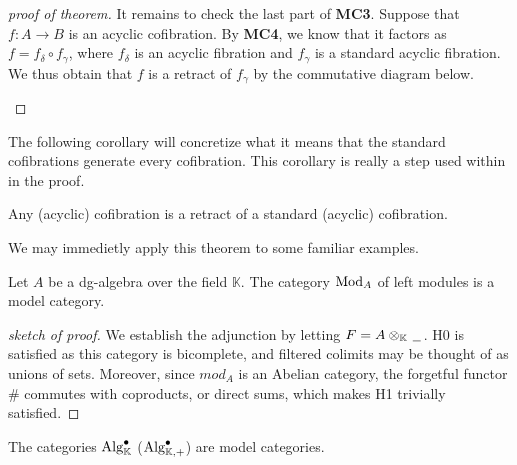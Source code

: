 \documentclass[../thesis.tex]{subfiles}
\begin{document}
\begin{proof}[proof of theorem]
                It remains to check the last part of \textbf{MC3}. Suppose that $f:A\rightarrow B$ is an acyclic cofibration. By \textbf{MC4}, we know that it factors as $f = f_\delta \circ f_\gamma$, where $f_\delta$ is an acyclic fibration and $f_\gamma$ is a standard acyclic fibration. We thus obtain that $f$ is a retract of $f_\gamma$ by the commutative diagram below.
                \begin{center}
                \end{center}
            \end{proof}

            The following corollary will concretize what it means that the standard cofibrations generate every cofibration. This corollary is really a step used within in the proof.

            \begin{corollary}
                Any (acyclic) cofibration is a retract of a standard (acyclic) cofibration.
            \end{corollary}

            We may immedietly apply this theorem to some familiar examples.

            \begin{corollary}\label{cor: Model-Mod}
                Let $A$ be a dg-algebra over the field $\mathbb{K}$. The category $\tt{Mod}_A$ of left modules is a model category.
            \end{corollary}

            \begin{proof}[sketch of proof]
                We establish the adjunction by letting $F = A\otimes_\mathbb{K}\argument$. H0 is satisfied as this category is bicomplete, and filtered colimits may be thought of as unions of sets. Moreover, since $mod_A$ is an Abelian category, the forgetful functor $\#$ commutes with coproducts, or direct sums, which makes H1 trivially satisfied.
            \end{proof}

            \begin{corollary}
                The categories $\tt{Alg}^\bullet_\mathbb{K}$ ($\tt{Alg}^\bullet_{\mathbb{K},+}$) are model categories.
            \end{corollary}
\end{document}
